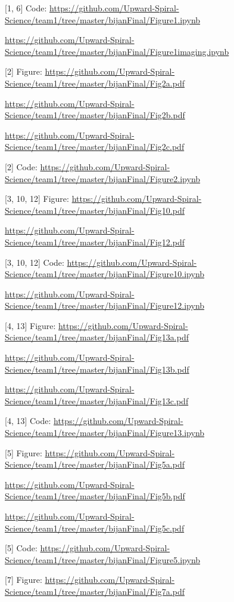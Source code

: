 \documentclass{article}
\begin{document}
[1, 6] Code:
{\tiny \url{https://github.com/Upward-Spiral-Science/team1/tree/master/bijanFinal/Figure1.ipynb}}

{\tiny \url{https://github.com/Upward-Spiral-Science/team1/tree/master/bijanFinal/Figure1imaging.ipynb}}

[2] Figure:
{\tiny \url{https://github.com/Upward-Spiral-Science/team1/tree/master/bijanFinal/Fig2a.pdf}}

{\tiny \url{https://github.com/Upward-Spiral-Science/team1/tree/master/bijanFinal/Fig2b.pdf}}

{\tiny \url{https://github.com/Upward-Spiral-Science/team1/tree/master/bijanFinal/Fig2c.pdf}}

[2] Code:
{\tiny \url{https://github.com/Upward-Spiral-Science/team1/tree/master/bijanFinal/Figure2.ipynb}}

[3, 10, 12] Figure:
{\tiny \url{https://github.com/Upward-Spiral-Science/team1/tree/master/bijanFinal/Fig10.pdf}}

{\tiny \url{https://github.com/Upward-Spiral-Science/team1/tree/master/bijanFinal/Fig12.pdf}}

[3, 10, 12] Code:
{\tiny \url{https://github.com/Upward-Spiral-Science/team1/tree/master/bijanFinal/Figure10.ipynb}}

{\tiny \url{https://github.com/Upward-Spiral-Science/team1/tree/master/bijanFinal/Figure12.ipynb}}

[4, 13] Figure:
{\tiny \url{https://github.com/Upward-Spiral-Science/team1/tree/master/bijanFinal/Fig13a.pdf}}

{\tiny \url{https://github.com/Upward-Spiral-Science/team1/tree/master/bijanFinal/Fig13b.pdf}}

{\tiny \url{https://github.com/Upward-Spiral-Science/team1/tree/master/bijanFinal/Fig13c.pdf}}

[4, 13] Code:
{\tiny \url{https://github.com/Upward-Spiral-Science/team1/tree/master/bijanFinal/Figure13.ipynb}}

[5] Figure:
{\tiny \url{https://github.com/Upward-Spiral-Science/team1/tree/master/bijanFinal/Fig5a.pdf}}

{\tiny \url{https://github.com/Upward-Spiral-Science/team1/tree/master/bijanFinal/Fig5b.pdf}}

{\tiny \url{https://github.com/Upward-Spiral-Science/team1/tree/master/bijanFinal/Fig5c.pdf}}

[5] Code:
{\tiny \url{https://github.com/Upward-Spiral-Science/team1/tree/master/bijanFinal/Figure5.ipynb}}

[7] Figure:
{\tiny \url{https://github.com/Upward-Spiral-Science/team1/tree/master/bijanFinal/Fig7a.pdf}}
\end{document}
